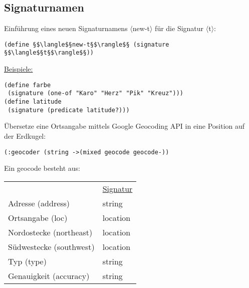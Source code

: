 \documentclass[a4paper,12pt]{article}
\begin{document}
\subsection{Signaturnamen}
Einführung eines neuen Signaturnamens $\langle$new-t$\rangle$ für die Signatur $\langle$t$\rangle$:
\begin{lstlisting}[style=customc]
(define §$\langle$§new-t§$\rangle$§ (signature §$\langle$§t§$\rangle$§))
\end{lstlisting}
\uline{Beispiele:}
\begin{lstlisting}[style=customc]
(define farbe
 (signature (one-of "Karo" "Herz" "Pik" "Kreuz")))
(define latitude
 (signature (predicate latitude?)))
\end{lstlisting}
Übersetze eine Ortsangabe mittels Google Geocoding
API in eine Position auf der Erdkugel:\\
\begin{lstlisting}[style=customc]
(:geocoder (string ->(mixed geocode geocode-))
\end{lstlisting}
Ein geocode besteht aus:\\
\begin{tabular}{ll}                    
 &							\uline{Signatur}\\
 Adresse (address)			&	string\\
 Ortsangabe (loc)			&	location\\
 Nordostecke (northeast)	&	location\\
 Südwestecke (southwest)	&	location\\
 Typ (type) 				&	string\\
 Genauigkeit (accuracy) 	&	string\\
\end{tabular}
\end{document}
